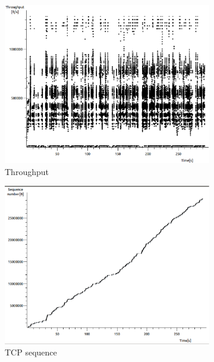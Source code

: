 \documentclass[conference,a4paper]{IEEEtran}
\begin{document}
\begin{figure}
 \centering
 \begin{subfigure}[b]{0.2\textwidth}
  \includegraphics[width=\textwidth]{s5-0_th}
  \caption{Throughput}
 \end{subfigure}
 \begin{subfigure}[b]{0.2\textwidth}
  \includegraphics[width=\textwidth]{s5-0_seq}
  \caption{TCP sequence}
 \end{subfigure}
 \begin{subfigure}[b]{0.2\textwidth}

\end{subfigure}
\end{figure}
\end{document}
